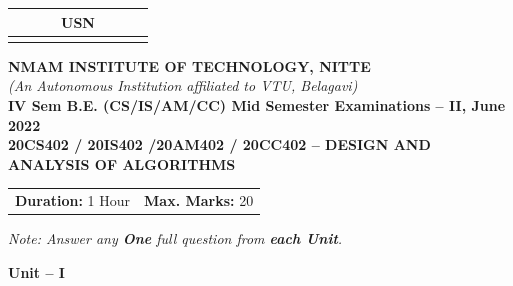 \documentclass[10pt,a4paper]{article}
\begin{document}
\begin{center}
\begin{tabular}{|c|c|c|c|c|c|c|c|c|c|}
\hline
\multicolumn{10}{|c|}{USN} \\
\hline
& & & & & & & & & \\
\hline
\end{tabular}

\vspace{0.3cm}

{\Large \textbf{NMAM INSTITUTE OF TECHNOLOGY, NITTE}}\\[0.15cm]
{\small \textit{(An Autonomous Institution affiliated to VTU, Belagavi)}}\\[0.2cm]
{\large \textbf{IV Sem B.E. (CS/IS/AM/CC) Mid Semester Examinations -- II, June 2022}}\\[0.15cm]
{\large \textbf{20CS402 / 20IS402 /20AM402 / 20CC402 -- DESIGN AND ANALYSIS OF ALGORITHMS}}\\[0.2cm]
\end{center}

\noindent
\begin{tabular}{p{8cm}r}
\textbf{Duration:} 1 Hour & \textbf{Max. Marks:} 20
\end{tabular}

\vspace{0.15cm}
\begin{center}
\textit{Note: Answer any \textbf{One} full question from \textbf{each Unit}.}
\end{center}

\vspace{0.15cm}

\begin{center}
{\large \textbf{Unit -- I}}
\end{center}
\end{document}
